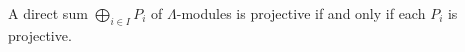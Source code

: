 A direct sum $\bigoplus_{i \in I} P_i$ of $\Lambda$-modules is projective if and only if each $P_i$ is projective.
